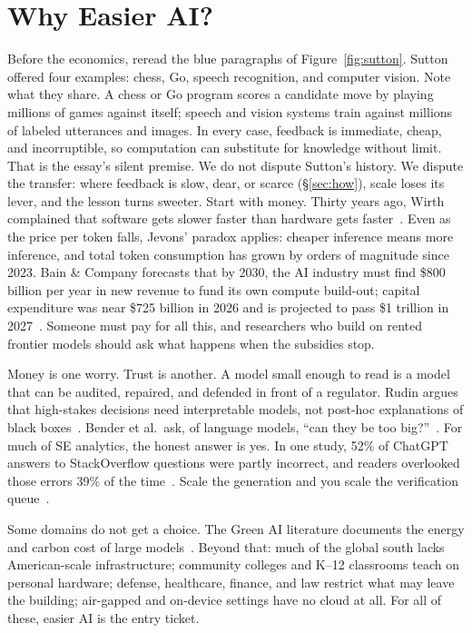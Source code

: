 \documentclass[10pt,conference]{IEEEtran}
\begin{document}
\section{Why Easier AI?}
\label{sec:why}
Before the economics, reread the blue paragraphs of
Figure~\ref{fig:sutton}. Sutton offered four examples: chess, Go,
speech recognition, and computer vision. Note what they share. A
chess or Go program scores a candidate move by playing millions of
games against itself; speech and vision systems train against
millions of labeled utterances and images. In every case, feedback is
immediate, cheap, and incorruptible, so computation can substitute
for knowledge without limit. That is the essay's silent premise. We
do not dispute Sutton's history. We dispute the transfer: where
feedback is slow, dear, or scarce (\S\ref{sec:how}), scale loses its
lever, and the lesson turns sweeter.
Start with money. Thirty years ago, Wirth complained that software
gets slower faster than hardware gets faster~\cite{wirth95}.
Even as the price per token falls,
Jevons' paradox applies: cheaper inference means more inference, and
total token consumption has grown by orders of magnitude since 2023.
Bain \& Company forecasts that by 2030, the AI industry must find
\$800 billion per year in new revenue to fund its own compute
build-out; capital expenditure was near \$725 billion in 2026 and is
projected to pass \$1 trillion in 2027~\cite{bain25}. Someone must
pay for all this, and researchers who build on rented frontier models
should ask what happens when the subsidies stop.

Money is one worry. Trust is another. A model small enough to read is
a model that can be audited, repaired, and defended in front of a
regulator. Rudin argues that high-stakes decisions need interpretable
models, not post-hoc explanations of black boxes~\cite{rudin19}.
Bender et al.\ ask, of language models, ``can they be too
big?''~\cite{bender21}. For much of SE analytics, the honest answer is
yes. In one study, 52\% of ChatGPT answers to StackOverflow questions
were partly incorrect, and readers overlooked those errors 39\% of
the time~\cite{kabir24}. Scale the generation and you scale the
verification queue~\cite{baltes26}.

Some domains do not get a choice. The Green AI literature documents
the energy and carbon cost of large models~\cite{schwartz20,
strubell19}. Beyond that: much of the global south
lacks American-scale infrastructure; community colleges and K--12
classrooms teach on personal hardware; defense, healthcare, finance,
and law restrict what may leave the building; air-gapped and
on-device settings have no cloud at all. For all of these, easier AI
is the entry ticket.
\end{document}
